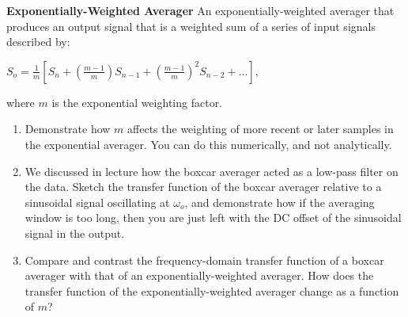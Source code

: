 \item {\bf Exponentially-Weighted Averager} An exponentially-weighted averager
  that produces an output signal that is a weighted sum of a series of input
  signals described by:

  \begin{center}
$S_{o} = \frac{1}{m}\left[S_n + \left(\frac{m-1}{m}\right)S_{n-1}+\left(\frac{m-1}{m}\right)^2S_{n-2} + \ldots\right],$
  \end{center}
  
where $m$ is the exponential weighting factor.
  
\begin{enumerate}
    \item Demonstrate how $m$ affects the weighting of more recent or later samples in the exponential averager.  You can do this numerically, and not analytically.
    \item We discussed in lecture how the boxcar averager acted as a low-pass
        filter on the data.  Sketch the transfer function of the boxcar
        averager relative to a sinusoidal signal oscillating at $\omega_o$, and
        demonstrate how if the averaging window is too long, then you are just
        left with the DC offset of the sinusoidal signal in the output. 

    \item Compare and contrast the frequency-domain transfer function of a
        boxcar averager with that of an exponentially-weighted averager.  How
        does the transfer function of the exponentially-weighted averager
        change as a function of $m$?
\end{enumerate}
